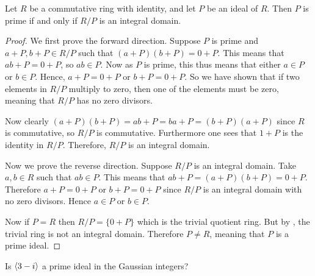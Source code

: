 \begin{theorem}\label{thrm-prime-ideal-iff-quotient-ring-is-integral-domain}
    Let $R$ be a commutative ring with identity, and let $P$ be an ideal of $R$. Then $P$ is prime if and only if $R/P$ is an integral domain.
\end{theorem}
\begin{proof}
    We first prove the forward direction. Suppose $P$ is prime and $a+P, b+P \in R/P$ such that $(a+P)(b+P) = 0+P$. This means that $ab + P = 0 + P$, so $ab \in P$. Now as $P$ is prime, this thus means that either $a \in P$ or $b \in P$. Hence, $a + P = 0 + P$ or $b + P = 0 + P$. So we have shown that if two elements in $R/P$ multiply to zero, then one of the elements must be zero, meaning that $R/P$ has no zero divisors.

    Now clearly $(a+P)(b+P) = ab + P = ba + P = (b+P)(a+P)$ since $R$ is commutative, so $R/P$ is commutative. Furthermore one sees that $1 + P$ is the identity in $R/P$. Therefore, $R/P$ is an integral domain.

    Now we prove the reverse direction. Suppose $R/P$ is an integral domain. Take $a,b \in R$ such that $ab \in P$. This means that $ab + P = (a+P)(b+P) = 0 + P$. Therefore $a+P = 0 + P$ or $b + P = 0 + P$ since $R/P$ is an integral domain with no zero divisors. Hence $a \in P$ or $b \in P$.

    Now if $P = R$ then $R/P = \{0 + P\}$ which is the trivial quotient ring. But by , the trivial ring is not an integral domain. Therefore $P \neq R$, meaning that $P$ is a prime ideal.
\end{proof}
\begin{exercise}
    Is $\left\langle3 - i\right\rangle$ a prime ideal in the Gaussian integers?
\end{exercise}

